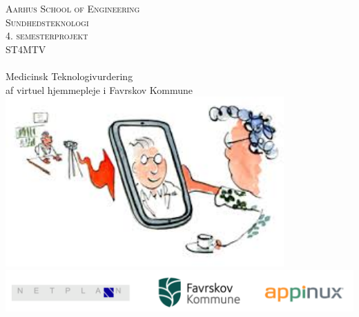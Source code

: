 \AtBeginShipoutNext{\AtBeginShipoutNext{\AtBeginShipoutDiscard}}
\begin{titlingpage}
\begin{center}


\textsc{\LARGE Aarhus School of Engineering}\\[1cm]

\textsc{\Large Sundhedsteknologi}\\
\textsc{\Large 4. semesterprojekt}\\
\textsc{\Large ST4MTV}\\[0.5cm]

\noindent\makebox[\linewidth]{\rule{\textwidth}{0.4pt}}\\
[0.5cm]{\Huge Medicinsk Teknologivurdering}\\
{af virtuel hjemmepleje i Favrskov Kommune}
\noindent\makebox[\linewidth]{\rule{\textwidth}{0.4pt}}\\[1cm]

\includegraphics[width=0.8\textwidth]{Figurer/forside}\\
\includegraphics[width=1\textwidth]{Figurer/Snip20160407_38}\\[1.5cm]



\end{center}



\end{titlingpage}
